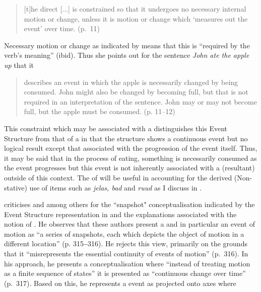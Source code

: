 \begin{quote}
[t]he direct  [...] is constrained so that it
undergoes no necessary internal motion or change, unless it is motion
or change which ‘measures out the event’ over time. (p.~11)
\end{quote}

Necessary motion or change as indicated by \citet{Tenny1994} means
that this is ``required by the verb’s meaning” (ibid).  Thus she points
out for the sentence \textit{John ate the apple up} that it


\begin{quote}
describes an event in which the apple is necessarily changed by being
consumed.  John might also be changed by becoming full, but that is
not required in an interpretation of the sentence. John may or may not
become full, but the apple must be consumed. (p. 11--12)
\end{quote}

This constraint which may be associated with a  distinguishes
this Event Structure from that of a  in that the structure
shows a continuous event but no logical result except that associated
with the progression of the event itself.  Thus, it may be said that
in the process of eating, something is necessarily consumed as the
event progresses but this event is not inherently associated with a
(resultant)  outside of this context.  The  of  will be useful in accounting for the derived (Non-stative) use of
items such as \textit{jelas, bad} and \textit{ruud} as I discuss in
.

\citet{Jackendoff1996} criticises \citet{Tenny1994} and
\citet{Pustejovsky1991} among others for the ``snapshot"
conceptualisation indicated by the Event Structure representation in
 and the explanations associated with the notion of
.  He observes that these authors present a  and in
particular an event of motion as ``a series of snapshots, each which
depicts the object of motion in a different location”
(p. 315\textbf{–}316).  He rejects this view, primarily on the grounds
that it ``misrepresents the essential continuity of events of motion”
(p.~316).  In his approach, he presents a conceptualisation where
``instead of treating motion as a finite sequence of states” it is
presented as ``continuous change over time” (p.~317).  Based on this,
he represents a  event as projected onto axes where


